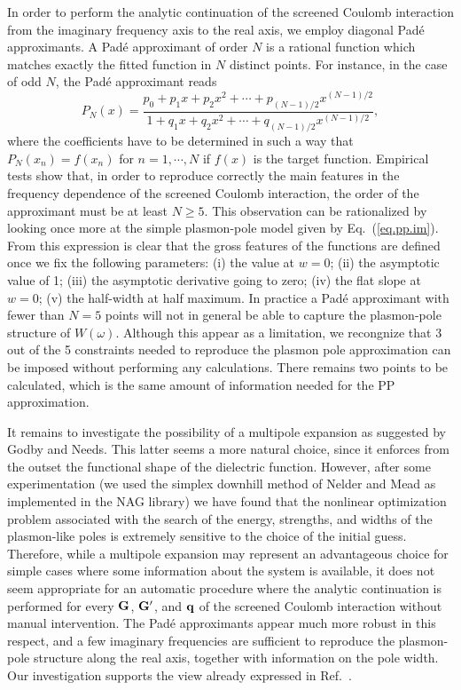 \documentclass[twocolumn,prb,showpacs,superscriptaddress]{revtex4}
\def\w{\omega}
\def\q{{\bf q}}
\def\G{{\bf G}}
\def\Gp{{\bf G^\prime}}
\begin{document}
In order to perform the analytic continuation of the screened Coulomb interaction
from the imaginary frequency axis to the real axis, we employ diagonal Pad\'e 
approximants.\cite{pade1,pade2,pade3}
A Pad\'e approximant of order $N$ is a rational function which matches exactly the fitted function
in $N$ distinct points. For instance, in the case of odd $N$, the Pad\'e approximant
reads
  \begin{equation}
  P_N(x) = \frac{p_0+p_1x+p_2x^2+\cdots+p_{(N-1)/2}x^{(N-1)/2}}{1+q_1x+q_2x^2+\cdots+q_{(N-1)/2}x^{(N-1)/2}},
  \end{equation}
where the coefficients have to be determined in such a way that $P_N(x_n)=f(x_n)$ for $n=1,\cdots,N$
if $f(x)$ is the target function.
Empirical tests show that, in order to reproduce correctly the main features in the 
frequency dependence of the screened Coulomb interaction, the order of the approximant
must be at least $N\ge5$.
This observation can be rationalized by looking once more at the simple plasmon-pole
model given by Eq.\ (\ref{eq.pp.im}). From this expression is clear that the gross
features of the functions are defined once we fix the following parameters:
(i) the value at $w=0$; (ii) the asymptotic value of 1; (iii) the asymptotic derivative
going to zero; (iv) the flat slope at $w=0$; (v) the half-width at half maximum.
In practice a Pad\'e approximant with fewer than $N=5$ points will not in general
be able to capture the plasmon-pole structure of $W(\w)$.
Although this appear as a limitation, we recongnize that 3 out of the 5 constraints
needed to reproduce the plasmon pole approximation can be imposed without performing
any calculations. There remains two points to be calculated, which is the same
amount of information needed for the PP approximation.

It remains to investigate the possibility of a multipole expansion as suggested
by Godby and Needs. This latter seems a more natural choice, since it enforces
from the outset the functional shape of the dielectric function.
However, after some experimentation (we used the simplex downhill method of 
Nelder and Mead as implemented in the NAG library) we have found that the nonlinear 
optimization problem associated with the search of the energy, strengths, and widths of the
plasmon-like poles is extremely sensitive to the choice of the initial guess.
Therefore, while a multipole expansion may represent an advantageous choice
for simple cases where some information about the system is available,
it does not seem appropriate for an automatic procedure where the analytic
continuation is performed for every $\G$, $\Gp$, and $\q$ of the screened
Coulomb interaction without manual intervention.
The Pad\'e approximants appear much more robust in this respect, and a few
imaginary frequencies are sufficient to reproduce the plasmon-pole structure
along the real axis, together with information on the pole width.
Our investigation supports the view already expressed in Ref.\ .
\end{document}
